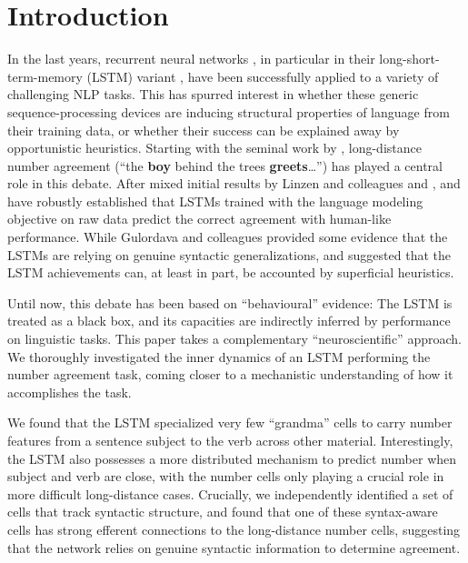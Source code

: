 \section{Introduction}

In the last years, recurrent neural networks \cite{Elman:1990}, in
particular in their long-short-term-memory (LSTM) variant
\cite{Hochreiter:Schmidhuber:1997}, have been successfully applied to
a variety of challenging NLP tasks. This has spurred interest in
whether these generic sequence-processing devices are inducing
structural properties of language from their training data, or whether
their success can be explained away by opportunistic
heuristics. Starting with the seminal work by
, long-distance number agreement (``the
\textbf{boy} behind the trees \textbf{greets}\ldots'') has played a
central role in this debate. After mixed initial results by Linzen and
colleagues and ,
 and  have
robustly established that LSTMs trained with the language modeling
objective on raw data predict the correct agreement with human-like
performance. While Gulordava and colleagues provided some evidence
that the LSTMs are relying on genuine syntactic generalizations,
 and 
suggested that the LSTM achievements can, at least in part, be
accounted by superficial heuristics.

Until now, this debate has been based on ``behavioural'' evidence: The
LSTM is treated as a black box, and its capacities are indirectly
inferred by performance on linguistic tasks. This paper takes a
complementary ``neuroscientific'' approach. We thoroughly investigated
the inner dynamics of an LSTM performing the number agreement task,
coming closer to a mechanistic understanding of how it accomplishes
the task.

We found that the LSTM specialized very few ``grandma'' cells
\cite{Bowers:2009} to carry number features from a sentence subject to
the verb across other material. Interestingly, the LSTM also possesses
a more distributed mechanism to predict number when subject and verb
are close, with the number cells only playing a crucial role in more
difficult long-distance cases. Crucially, we independently identified
a set of cells that track syntactic structure, and found that one of
these syntax-aware cells has strong efferent connections to the
long-distance number cells, suggesting that the network relies on
genuine syntactic information to determine agreement.

